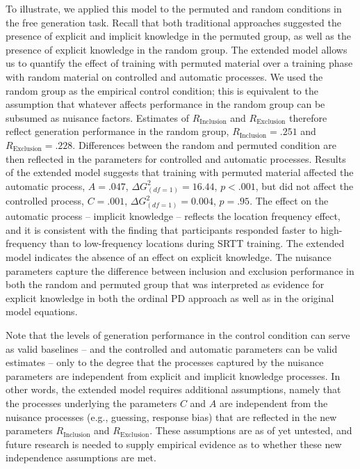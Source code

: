 \documentclass[
  english,
  man]{apa6}
\begin{document}
To illustrate, we applied this model to the permuted and random conditions in the free generation task.
Recall that both traditional approaches suggested the presence of explicit and implicit knowledge in the permuted group, as well as the presence of explicit knowledge in the random group.
The extended model allows us to quantify the effect of training with permuted material over a training phase with random material on controlled and automatic processes.
We used the random group as the empirical control condition; this is equivalent to the assumption that whatever affects performance in the random group can be subsumed as nuisance factors.
Estimates of \(R_{\mathrm{Inclusion}}\) and \(R_{\mathrm{Exclusion}}\) therefore reflect generation performance in the random group, \(R_{\mathrm{Inclusion}} = .251\) and \(R_{\mathrm{Exclusion}} = .228\).
Differences between the random and permuted condition are then reflected in the parameters for controlled and automatic processes.
Results of the extended model suggests that training with permuted material affected the automatic process, \(A = .047\), \(\Delta G^2_{(df=1)} = 16.44\), \(p < .001\), but did not affect the controlled process, \(C = .001\), \(\Delta G^2_{(df=1)} = 0.004\), \(p=.95\).
The effect on the automatic process -- implicit knowledge -- reflects the location frequency effect, and it is consistent with the finding that participants responded faster to high-frequency than to low-frequency locations during SRTT training.
The extended model indicates the absence of an effect on explicit knowledge.
The nuisance parameters capture the difference between inclusion and exclusion performance in both the random and permuted group that was interpreted as evidence for explicit knowledge in both the ordinal PD approach as well as in the original model equations.

Note that the levels of generation performance in the control condition can serve as valid baselines -- and the controlled and automatic parameters can be valid estimates -- only to the degree that the processes captured by the nuisance parameters are independent from explicit and implicit knowledge processes.
In other words, the extended model requires additional assumptions, namely that the processes underlying the parameters \(C\) and \(A\) are independent from the nuisance processes (e.g., guessing, response bias) that are reflected in the new parameters \(R_{\mathrm{Inclusion}}\) and \(R_{\mathrm{Exclusion}}\).
These assumptions are as of yet untested, and future research is needed to supply empirical evidence as to whether these new independence assumptions are met.
\end{document}
